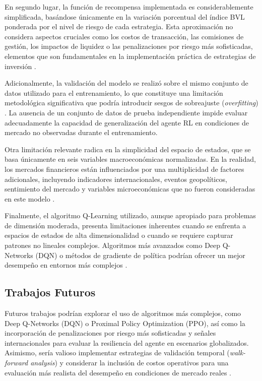 \documentclass[conference]{IEEEtran}
\begin{document}
	En segundo lugar, la función de recompensa implementada es considerablemente simplificada, basándose únicamente en la variación porcentual del índice BVL ponderada por el nivel de riesgo de cada estrategia. Esta aproximación no considera aspectos cruciales como los costos de transacción, las comisiones de gestión, los impactos de liquidez o las penalizaciones por riesgo más sofisticadas, elementos que son fundamentales en la implementación práctica de estrategias de inversión \cite{brennan2012portfolio, grinold2000active}.
	
	Adicionalmente, la validación del modelo se realizó sobre el mismo conjunto de datos utilizado para el entrenamiento, lo que constituye una limitación metodológica significativa que podría introducir sesgos de sobreajuste (\textit{overfitting}) \cite{hastie2009elements}. La ausencia de un conjunto de datos de prueba independiente impide evaluar adecuadamente la capacidad de generalización del agente RL en condiciones de mercado no observadas durante el entrenamiento.
	
	Otra limitación relevante radica en la simplicidad del espacio de estados, que se basa únicamente en seis variables macroeconómicas normalizadas. En la realidad, los mercados financieros están influenciados por una multiplicidad de factores adicionales, incluyendo indicadores internacionales, eventos geopolíticos, sentimiento del mercado y variables microeconómicas que no fueron consideradas en este modelo \cite{fama2015five, cochrane2017macro}.
	
	Finalmente, el algoritmo Q-Learning utilizado, aunque apropiado para problemas de dimensión moderada, presenta limitaciones inherentes cuando se enfrenta a espacios de estados de alta dimensionalidad o cuando se requiere capturar patrones no lineales complejos. Algoritmos más avanzados como Deep Q-Networks (DQN) o métodos de gradiente de política podrían ofrecer un mejor desempeño en entornos más complejos \cite{mnih2015human, schulman2017proximal}.
	
	\subsection{Trabajos Futuros}
	
	Futuros trabajos podrían explorar el uso de algoritmos más complejos, como Deep Q-Networks (DQN) o Proximal Policy Optimization (PPO), así como la incorporación de penalizaciones por riesgo más sofisticadas y señales internacionales para evaluar la resiliencia del agente en escenarios globalizados. Asimismo, sería valioso implementar estrategias de validación temporal (\textit{walk-forward analysis}) y considerar la inclusión de costos operativos para una evaluación más realista del desempeño en condiciones de mercado reales \cite{harvey2016backtesting, lopez2013methodology}.
	
\end{document}
